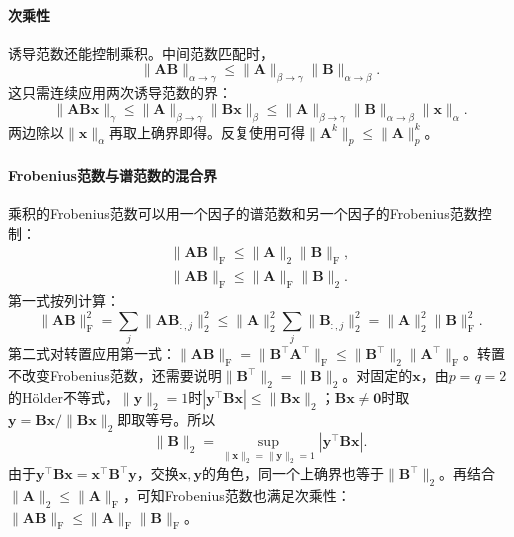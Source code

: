 \paragraph{次乘性}
诱导范数还能控制乘积。中间范数匹配时，
\[
 \lVert\bm A\bm B\rVert_{\alpha\to\gamma}
 \leq\lVert\bm A\rVert_{\beta\to\gamma}
 \lVert\bm B\rVert_{\alpha\to\beta}.
\]
这只需连续应用两次诱导范数的界：
\[
 \lVert\bm A\bm B\bm x\rVert_\gamma\leq\lVert\bm A\rVert_{\beta\to\gamma}\lVert\bm B\bm x\rVert_\beta\leq\lVert\bm A\rVert_{\beta\to\gamma}\lVert\bm B\rVert_{\alpha\to\beta}\lVert\bm x\rVert_\alpha.
\]
两边除以$\lVert\bm x\rVert_\alpha$再取上确界即得。反复使用可得$\lVert\bm A^k\rVert_p\leq\lVert\bm A\rVert_p^k$。

\paragraph{Frobenius范数与谱范数的混合界}
乘积的Frobenius范数可以用一个因子的谱范数和另一个因子的Frobenius范数控制：
\begin{equation}
\begin{gathered}
\lVert\bm A\bm B\rVert_{\mathrm F}
 \leq\lVert\bm A\rVert_2\lVert\bm B\rVert_{\mathrm F},\\
\lVert\bm A\bm B\rVert_{\mathrm F}
 \leq\lVert\bm A\rVert_{\mathrm F}\lVert\bm B\rVert_2.
\end{gathered}
\label{eq:matrix-analysis-mixed-submultiplicativity}
\end{equation}
第一式按列计算：
\[
 \lVert\bm A\bm B\rVert_{\mathrm F}^2=\sum_j\lVert\bm A\bm B_{:,j}\rVert_2^2\leq\lVert\bm A\rVert_2^2\sum_j\lVert\bm B_{:,j}\rVert_2^2=\lVert\bm A\rVert_2^2\lVert\bm B\rVert_{\mathrm F}^2.
\]
第二式对转置应用第一式：$\lVert\bm A\bm B\rVert_{\mathrm F}=\lVert\bm B^\top\bm A^\top\rVert_{\mathrm F}\leq\lVert\bm B^\top\rVert_2\lVert\bm A^\top\rVert_{\mathrm F}$。转置不改变Frobenius范数，还需要说明$\lVert\bm B^\top\rVert_2=\lVert\bm B\rVert_2$。对固定的$\bm x$，由$p=q=2$的Hölder不等式，$\lVert\bm y\rVert_2=1$时$|\bm y^\top\bm B\bm x|\leq\lVert\bm B\bm x\rVert_2$；$\bm B\bm x\neq\bm0$时取$\bm y=\bm B\bm x/\lVert\bm B\bm x\rVert_2$即取等号。所以
\[
 \lVert\bm B\rVert_2=\sup_{\lVert\bm x\rVert_2=\lVert\bm y\rVert_2=1}|\bm y^\top\bm B\bm x|.
\]
由于$\bm y^\top\bm B\bm x=\bm x^\top\bm B^\top\bm y$，交换$\bm x,\bm y$的角色，同一个上确界也等于$\lVert\bm B^\top\rVert_2$。再结合$\lVert\bm A\rVert_2\leq\lVert\bm A\rVert_{\mathrm F}$，可知Frobenius范数也满足次乘性：$\lVert\bm A\bm B\rVert_{\mathrm F}\leq\lVert\bm A\rVert_{\mathrm F}\lVert\bm B\rVert_{\mathrm F}$。

